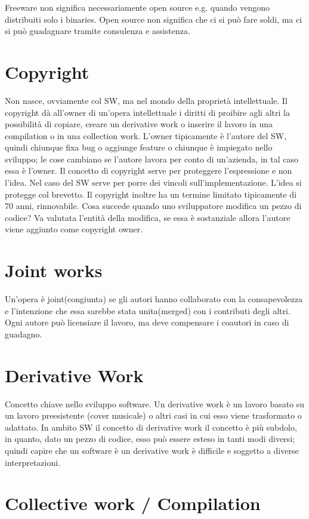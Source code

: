 \documentclass[10pt,a4paper]{book}
\begin{document}
Freeware non significa necessariamente open source e.g. quando vengono distribuiti solo i binaries.
Open source non significa che ci si può fare soldi, ma ci si può guadagnare tramite consulenza e assistenza.

\section{Copyright}
Non nasce, ovviamente col SW, ma nel mondo della proprietà intellettuale. Il copyright dà all'owner di un'opera intellettuale i diritti di proibire agli altri la possibilità di copiare, creare un derivative work o inserire il lavoro in una compilation o in una collection work.
L'owner tipicamente è l'autore del SW, quindi chiunque fixa bug o aggiunge feature o chiunque è impiegato nello sviluppo; le cose cambiano se l'autore lavora per conto di un'azienda, in tal caso essa è l'owner. 
Il concetto di copyright serve per proteggere l'espressione e non l'idea. Nel caso del SW serve per porre dei vincoli sull'implementazione. L'idea si protegge col brevetto.
Il copyright inoltre ha un termine limitato tipicamente di 70 anni, rinnovabile.
Cosa succede quando uno sviluppatore modifica un pezzo di codice?
Va valutata l'entità della modifica, se essa è sostanziale allora l'autore viene aggiunto come copyright owner.

\section{Joint works}
Un'opera è joint(congiunta) se gli autori hanno collaborato con la consapevolezza e l'intenzione che essa sarebbe stata unita(merged) con i contributi degli altri.
Ogni autore può licensiare il lavoro, ma deve compensare i coautori in caso di guadagno.
 
\section{Derivative Work}
Concetto chiave nello sviluppo software.
Un derivative work è un lavoro basato su un lavoro preesistente (cover musicale) o altri casi in cui esso viene trasformato o adattato.
In ambito SW il concetto di derivative work il concetto è più subdolo, in quanto, dato un pezzo di codice, esso può essere esteso in tanti modi diversi; quindi capire che un software è un derivative work è difficile e soggetto a diverse interpretazioni.

\section{Collective work / Compilation}
\end{document}
